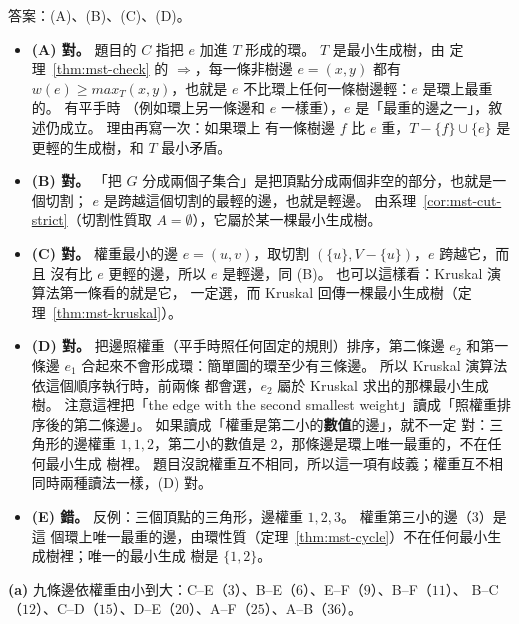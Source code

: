答案：(A)、(B)、(C)、(D)。

\begin{itemize}
\item \textbf{(A) 對。} 題目的 $C$ 指把 $e$ 加進 $T$ 形成的環。 $T$ 是最小生成樹，由
定理~\ref{thm:mst-check} 的 $\Rightarrow$，每一條非樹邊 $e = (x, y)$ 都有
$w(e) \ge \mathit{max}_T(x, y)$，也就是 $e$ 不比環上任何一條樹邊輕：$e$ 是環上最重的。 有平手時
（例如環上另一條邊和 $e$ 一樣重），$e$ 是「最重的邊之一」，敘述仍成立。 理由再寫一次：如果環上
有一條樹邊 $f$ 比 $e$ 重，$T - \{f\} \cup \{e\}$ 是更輕的生成樹，和 $T$ 最小矛盾。
\item \textbf{(B) 對。} 「把 $G$ 分成兩個子集合」是把頂點分成兩個非空的部分，也就是一個切割；
$e$ 是跨越這個切割的最輕的邊，也就是輕邊。 由系理~\ref{cor:mst-cut-strict}（切割性質取
$A = \emptyset$），它屬於某一棵最小生成樹。
\item \textbf{(C) 對。} 權重最小的邊 $e = (u, v)$，取切割 $(\{u\}, V - \{u\})$，$e$ 跨越它，而且
沒有比 $e$ 更輕的邊，所以 $e$ 是輕邊，同 (B)。 也可以這樣看：Kruskal 演算法第一條看的就是它，
一定選，而 Kruskal 回傳一棵最小生成樹（定理~\ref{thm:mst-kruskal}）。
\item \textbf{(D) 對。} 把邊照權重（平手時照任何固定的規則）排序，第二條邊 $e_2$ 和第一條邊
$e_1$ 合起來不會形成環：簡單圖的環至少有三條邊。 所以 Kruskal 演算法依這個順序執行時，前兩條
都會選，$e_2$ 屬於 Kruskal 求出的那棵最小生成樹。 注意這裡把「the edge with the second smallest
weight」讀成「照權重排序後的第二條邊」。 如果讀成「權重是第二小的\textbf{數值}的邊」，就不一定
對：三角形的邊權重 $1, 1, 2$，第二小的數值是 $2$，那條邊是環上唯一最重的，不在任何最小生成
樹裡。 題目沒說權重互不相同，所以這一項有歧義；權重互不相同時兩種讀法一樣，(D) 對。
\item \textbf{(E) 錯。} 反例：三個頂點的三角形，邊權重 $1, 2, 3$。 權重第三小的邊（$3$）是這
個環上唯一最重的邊，由環性質（定理~\ref{thm:mst-cycle}）不在任何最小生成樹裡；唯一的最小生成
樹是 $\{1, 2\}$。
\end{itemize}

\textbf{(a)} 九條邊依權重由小到大：C--E（$3$）、B--E（$6$）、E--F（$9$）、B--F（$11$）、
B--C（$12$）、C--D（$15$）、D--E（$20$）、A--F（$25$）、A--B（$36$）。

